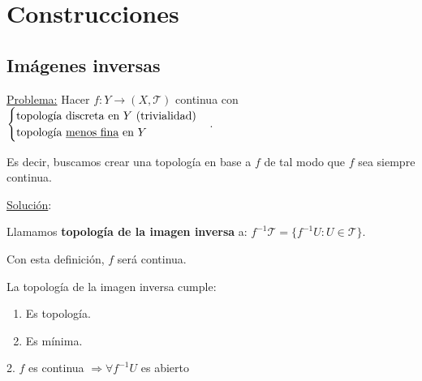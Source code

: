 \chapter{Construcciones}%
\label{cha:construcciones}


\section{Imágenes inversas}%
\label{sec:imagenes_inversas}
\underline{Problema:} Hacer $f: Y \rightarrow \left( X, \mathcal{T} \right)$ continua con $\begin{cases}
    \text{topología discreta en } Y \text{ (trivialidad)}\\
    \text{topología \underline{menos fina} en } Y 
\end{cases}$. 

Es decir, buscamos crear una topología en base a $f$ de tal modo que $f$ sea siempre continua.

\underline{Solución}: 
\begin{defi}    
Llamamos \textbf{topología de la imagen inversa} a: $f^{-1} \mathcal{T} = \{f^{-1}U: U \in \mathcal{T}\}$.
\end{defi}
\begin{obs}
Con esta definición, $f$ será continua.
\end{obs}
\begin{prop}    
La topología de la imagen inversa cumple:
\begin{enumerate}
    \item Es topología. 
    \item Es mínima. 
\end{enumerate}
\end{prop}
\begin{demo}
    2. $f$ es continua $\Rightarrow \forall f^{-1}U$ es abierto
\end{demo}


